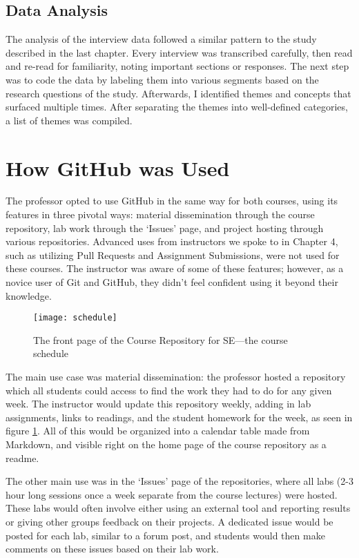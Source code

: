 
\subsection{Data Analysis}
The analysis of the interview data followed a similar pattern to the study described in the last chapter. Every interview was transcribed carefully, then read and re-read for familiarity, noting important sections or responses. The next step was to code the data by labeling them into various segments based on the research questions of the study. Afterwards, I identified themes and concepts that surfaced multiple times. After separating the themes into well-defined categories, a list of themes was compiled.


\section{How GitHub was Used}
The professor opted to use GitHub in the same way for both courses, using its features in three pivotal ways: material dissemination through the course repository, lab work through the `Issues' page, and project hosting through various repositories. Advanced uses from instructors we spoke to in Chapter 4, such as utilizing Pull Requests and Assignment Submissions, were not used for these courses. The instructor was aware of some of these features; however, as a novice user of Git and GitHub, they didn't feel confident using it beyond their knowledge.

\begin{figure}[h!]
 \caption{The front page of the Course Repository for SE---the course schedule}
 \centering
   \texttt{[image: schedule]}
 \label{fig:schedule}
\end{figure}

The main use case was material dissemination: the professor hosted a repository which all students could access to find the work they had to do for any given week. The instructor would update this repository weekly, adding in lab assignments, links to readings, and the student homework for the week, as seen in figure \ref{fig:schedule}. All of this would be organized into a calendar table made from Markdown, and visible right on the home page of the course repository as a readme.

The other main use was in the `Issues' page of the repositories, where all labs (2-3 hour long sessions once a week separate from the course lectures) were hosted. These labs would often involve either using an external tool and reporting results or giving other groups feedback on their projects. A dedicated issue would be posted for each lab, similar to a forum post, and students would then make comments on these issues based on their lab work.

